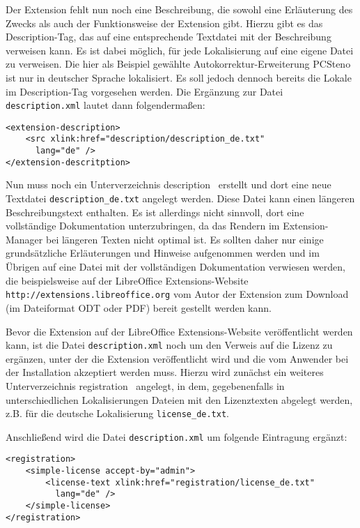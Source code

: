 \documentclass[a4paper,10pt,pagesize,titlepage]{scrbook}
\begin{document}
Der Extension fehlt nun noch eine Beschreibung, die sowohl eine Erläuterung des Zwecks als auch der Funktionsweise der Extension gibt. Hierzu gibt es das Description-Tag, das auf eine entsprechende Textdatei mit der Beschreibung verweisen kann. Es ist dabei möglich, für jede Lokalisierung auf eine eigene Datei zu verweisen. Die hier als Beispiel gewählte Autokorrektur-Erweiterung PCSteno ist nur in deutscher Sprache lokalisiert. Es soll jedoch dennoch bereits die Lokale im Description-Tag vorgesehen werden. Die Ergänzung zur Datei \verb|description.xml| lautet dann folgendermaßen:
\begin{lstlisting}
<extension-description>
    <src xlink:href="description/description_de.txt" 
      lang="de" />
</extension-descritption>
\end{lstlisting}

Nun muss noch ein Unterverzeichnis \glqq description\grqq~ erstellt und dort eine neue Textdatei \verb|description_de.txt| angelegt werden. Diese Datei kann einen längeren Beschreibungstext enthalten. Es ist allerdings nicht sinnvoll, dort eine vollständige Dokumentation unterzubringen, da das Rendern im Extension-Manager bei längeren Texten nicht optimal ist. Es sollten daher nur einige grundsätzliche Erläuterungen und Hinweise aufgenommen werden und im Übrigen auf eine Datei mit der vollständigen Dokumentation verwiesen werden, die beispielsweise auf der LibreOffice Extensions-Website \verb|http://extensions.libreoffice.org| vom Autor der Extension zum Download (im Dateiformat ODT oder PDF) bereit gestellt werden kann.

Bevor die Extension auf der LibreOffice Extensions-Website veröffentlicht werden kann, ist die Datei \verb|description.xml| noch um den Verweis auf die Lizenz zu ergänzen, unter der die Extension veröffentlicht wird und die vom Anwender bei der Installation akzeptiert werden muss. Hierzu wird zunächst ein weiteres Unterverzeichnis \glqq registration\grqq~ angelegt, in dem, gegebenenfalls in unterschiedlichen Lokalisierungen Dateien mit den Lizenztexten abgelegt werden, z.B. für die deutsche Lokalisierung \verb|license_de.txt|. 

Anschließend wird die Datei \verb|description.xml| um folgende Eintragung ergänzt:
\begin{lstlisting}
<registration>
    <simple-license accept-by="admin">
        <license-text xlink:href="registration/license_de.txt" 
          lang="de" />
    </simple-license>
</registration>
\end{lstlisting}
\end{document}
